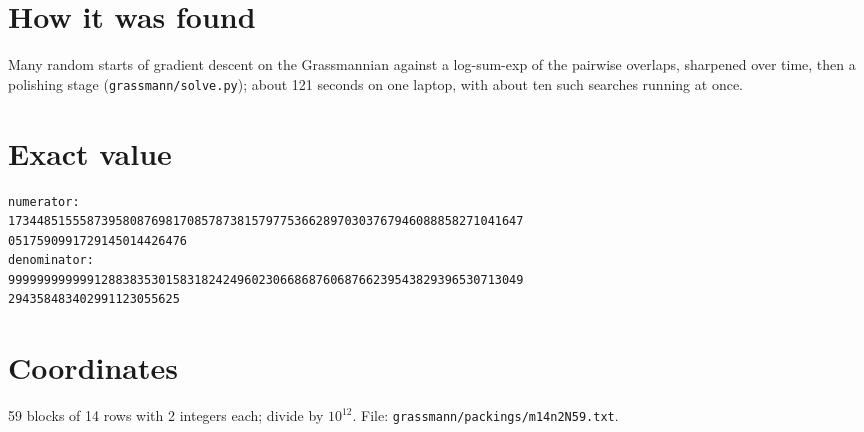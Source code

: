 \documentclass[11pt,a4paper]{article}
\begin{document}
\section{How it was found}
Many random starts of gradient descent on the Grassmannian against a log-sum-exp of the pairwise overlaps, sharpened over time, then a polishing stage (\texttt{grassmann/solve.py}); about 121 seconds on one laptop, with about ten such searches running at once.


\appendix
\section{Exact value}
{\small
\begin{verbatim}
numerator:
173448515558739580876981708578738157977536628970303767946088858271041647
0517590991729145014426476
denominator:
999999999999128838353015831824249602306686876068766239543829396530713049
294358483402991123055625
\end{verbatim}}

\section{Coordinates}
59 blocks of 14 rows with 2 integers each; divide by $10^{12}$. File: \texttt{grassmann/packings/m14n2N59.txt}.
{\tiny
\begin{multicols}{4}
\end{multicols}}
\end{document}
